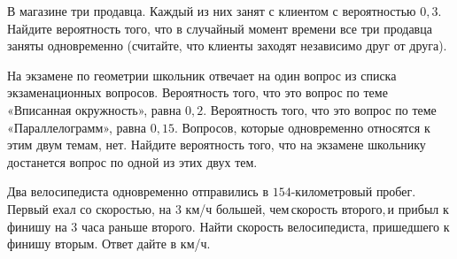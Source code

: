 \begin{class}[number=1]
\begin{listofex}
		\item В магазине три продавца. Каждый из них занят с клиентом с вероятностью \( 0,3 \). Найдите вероятность того, что в случайный момент времени все три продавца заняты одновременно (считайте, что клиенты заходят независимо друг от друга).
		\item На экзамене по геометрии школьник отвечает на один вопрос из списка экзаменационных вопросов. Вероятность того, что это вопрос по теме «Вписанная окружность», равна \( 0,2 \). Вероятность того, что это вопрос по теме «Параллелограмм», равна \( 0,15 \). Вопросов, которые одновременно относятся к этим двум темам, нет. Найдите вероятность того, что на экзамене школьнику достанется вопрос по одной из этих двух тем.
		\item Два велосипедиста одновременно отправились в \( 154 \)-километровый пробег. Первый ехал со скоростью, на \( 3 \) км/ч большей, чем скорость второго, и прибыл к финишу на \( 3 \) часа раньше второго. Найти скорость велосипедиста, пришедшего к финишу вторым. Ответ дайте в км/ч. 
		
	\end{listofex}
\end{class}

